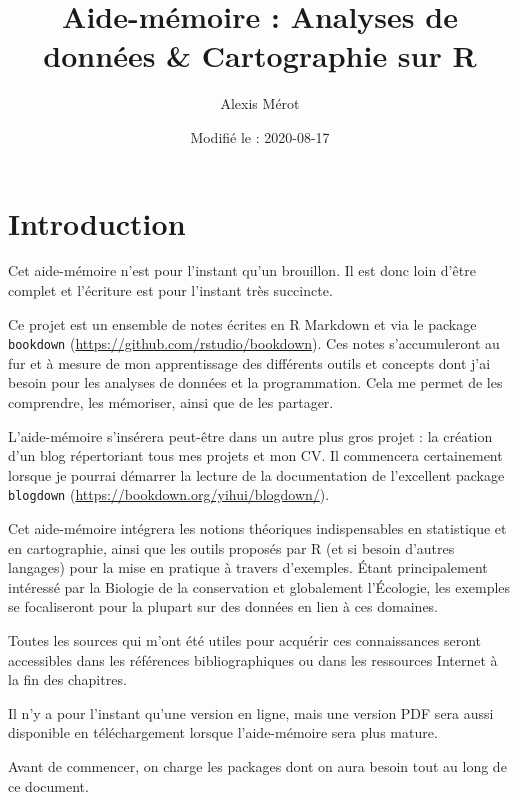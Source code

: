 \documentclass[
  french,
]{book}
\title{Aide-mémoire : Analyses de données \& Cartographie sur R}
\author{Alexis Mérot}
\date{Modifié le : 2020-08-17}
\newenvironment{infobox}[1]
  {
  \begin{itemize}
  \renewcommand{\labelitemi}{
    \raisebox{-.7\height}[0pt][0pt]{
      {\setkeys{Gin}{width=3em,keepaspectratio}
        \texttt{[image: images/\#1]}}
    }
  }
  \setlength{\fboxsep}{1em}
  \begin{blackbox}
  \item
  }
  {
  \end{blackbox}
  \end{itemize}
  }
\begin{document}
\maketitle

{
\setcounter{tocdepth}{1}
\tableofcontents
}
\hypertarget{introduction}{%
\chapter*{Introduction}\label{introduction}}

\begin{infobox}{caution}

Cet aide-mémoire n'est pour l'instant qu'un brouillon. Il est donc loin d'être complet et l'écriture est pour l'instant très succincte.

\end{infobox}

Ce projet est un ensemble de notes écrites en R Markdown \citep{R-rmarkdown} et via
le package \texttt{bookdown} (\url{https://github.com/rstudio/bookdown}). Ces notes
s'accumuleront au fur et à mesure de mon apprentissage des différents outils et
concepts dont j'ai besoin pour les analyses de données et la programmation. Cela
me permet de les comprendre, les mémoriser, ainsi que de les partager.

L'aide-mémoire s'insérera peut-être dans un autre plus gros projet : la création
d'un blog répertoriant tous mes projets et mon CV. Il commencera certainement
lorsque je pourrai démarrer la lecture de la documentation de l'excellent
package \texttt{blogdown} (\url{https://bookdown.org/yihui/blogdown/}).

Cet aide-mémoire intégrera les notions théoriques indispensables en statistique
et en cartographie, ainsi que les outils proposés par R (et si besoin d'autres
langages) pour la mise en pratique à travers d'exemples. Étant principalement
intéressé par la Biologie de la conservation et globalement l'Écologie, les
exemples se focaliseront pour la plupart sur des données en lien à ces domaines.

Toutes les sources qui m'ont été utiles pour acquérir ces connaissances seront
accessibles dans les références bibliographiques ou dans les ressources Internet
à la fin des chapitres.

Il n'y a pour l'instant qu'une version en ligne, mais une version PDF sera aussi disponible en téléchargement lorsque l'aide-mémoire sera plus mature.

Avant de commencer, on charge les packages dont on aura besoin tout au long de
ce document.
\end{document}
